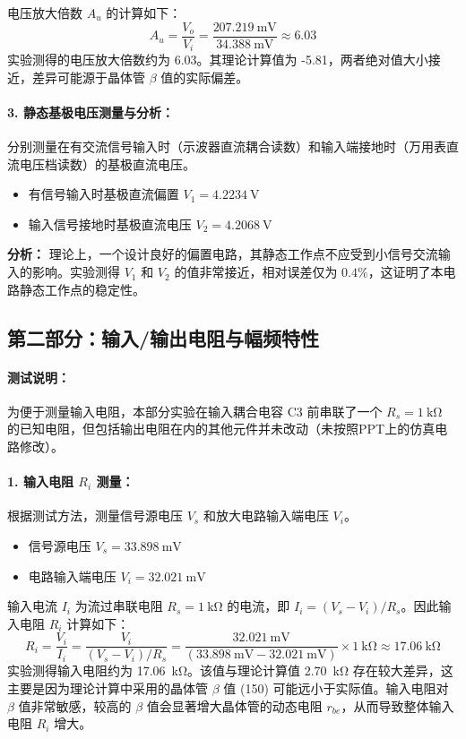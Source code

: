 \documentclass[UTF8, a4paper]{ctexrep} %
\begin{document}
电压放大倍数 $A_u$ 的计算如下：
\begin{equation}
    A_u = \frac{V_o}{V_i} = \frac{\SI{207.219}{\milli\volt}}{\SI{34.388}{\milli\volt}} \approx 6.03
\end{equation}
实验测得的电压放大倍数约为 6.03。其理论计算值为 -5.81，两者绝对值大小接近，差异可能源于晶体管 $\beta$ 值的实际偏差。

\paragraph{3. 静态基极电压测量与分析：}
分别测量在有交流信号输入时（示波器直流耦合读数）和输入端接地时（万用表直流电压档读数）的基极直流电压。
\begin{itemize}
    \item 有信号输入时基极直流偏置 $V_1 = \SI{4.2234}{\volt}$
    \item 输入信号接地时基极直流电压 $V_2 = \SI{4.2068}{\volt}$
\end{itemize}
\textbf{分析：} 理论上，一个设计良好的偏置电路，其静态工作点不应受到小信号交流输入的影响。实验测得 $V_1$ 和 $V_2$ 的值非常接近，相对误差仅为 $0.4\%$，这证明了本电路静态工作点的稳定性。

\subsection{第二部分：输入/输出电阻与幅频特性}

\paragraph{测试说明：}
为便于测量输入电阻，本部分实验在输入耦合电容 C3 前串联了一个 $R_s = \SI{1}{\kilo\ohm}$ 的已知电阻，但包括输出电阻在内的其他元件并未改动（未按照PPT上的仿真电路修改）。
\paragraph{1. 输入电阻 $R_i$ 测量：}
根据测试方法，测量信号源电压 $V_s$ 和放大电路输入端电压 $V_i$。
\begin{itemize}
    \item 信号源电压 $V_s = \SI{33.898}{\milli\volt}$
    \item 电路输入端电压 $V_i = \SI{32.021}{\milli\volt}$
\end{itemize}
输入电流 $I_i$ 为流过串联电阻 $R_s = \SI{1}{\kilo\ohm}$ 的电流，即 $I_i = (V_s - V_i) / R_s$。因此输入电阻 $R_i$ 计算如下：
\begin{equation}
    R_i = \frac{V_i}{I_i} = \frac{V_i}{(V_s - V_i) / R_s} = \frac{\SI{32.021}{\milli\volt}}{(\SI{33.898}{\milli\volt} - \SI{32.021}{\milli\volt})} \times \SI{1}{\kilo\ohm} \approx \SI{17.06}{\kilo\ohm}
\end{equation}
实验测得输入电阻约为 \SI{17.06}{\kilo\ohm}。该值与理论计算值 \SI{2.70}{\kilo\ohm} 存在较大差异，这主要是因为理论计算中采用的晶体管 $\beta$ 值 (150) 可能远小于实际值。输入电阻对 $\beta$ 值非常敏感，较高的 $\beta$ 值会显著增大晶体管的动态电阻 $r_{be}$，从而导致整体输入电阻 $R_i$ 增大。
\end{document}
